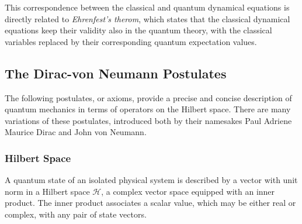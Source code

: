     This correspondence between the classical and quantum dynamical equations is 
    directly related to \emph{Ehrenfest's therom}, which states that the classical 
    dynamical equations keep their validity also in the quantum theory, with the 
    classical variables replaced by their corresponding quantum expectation
    values\cite{ehrenfest1927bemerkung}.

\subsection{The Dirac-von Neumann Postulates}

    The following postulates, or axioms, provide a precise and concise description 
    of quantum mechanics in terms of operators on the Hilbert space. There are
    many variations of these postulates, introduced both by their namesakes 
    Paul Adriene Maurice Dirac\cite{dirac1930principles} and John von 
    Neumann\cite{vonNeumann1932foundations}.

    \subsubsection{Hilbert Space}
    A quantum state of an isolated physical system is described by a vector
    with unit norm in a Hilbert space $\mathcal{H}$, 
    a complex vector space equipped with an inner product. The inner product 
    associates a scalar value, which may be either real or complex, with any pair
    of state vectors.
    
